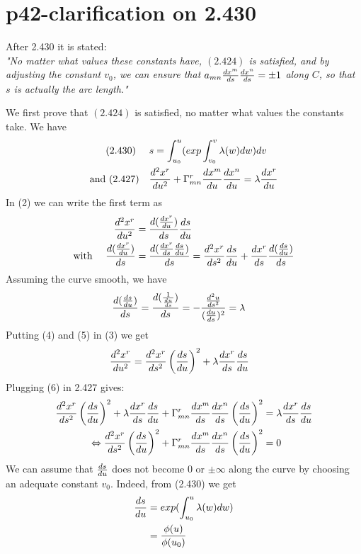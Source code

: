 \section{p42-clarification on 2.430}
\begin{tcolorbox}
After 2.430 it is stated:\\
\it{"No matter what values these constants have, $\mathbf{(2.424)}$ is satisfied, and by adjusting the constant $v_0$, we can ensure that $a_{mn}\dv{x^m}{s}\dv{x^n}{s} = \pm1$ along $C$, so that $s$ is actually the arc length."}
\end{tcolorbox}
We first prove that $\mathbf{(2.424)}$  is satisfied, no matter what values the constants take. We have
\begin{align}
\text{(2.430) } \quad  &s =\int_{u_0}^u(exp\int_{v_0}^v \lambda (w)dw)dv\\
\text{and (2.427)} \quad &\dv[2]{x^r}{u} + \Gamma^r_{mn}\dv{x^m}{u}\dv{x^n}{u} =  \lambda \dv{x^r}{u}
\end{align}
In (2) we can write the first term as
\begin{align}
\quad \dv[2]{x^r}{u} &= \dv{(\dv{x^r}{u})}{s}\dv{s}{u} \\
\text{with } \quad \dv{(\dv{x^r}{u})}{s} &=  \dv{(\dv{x^r}{s}\dv{s}{u})}{s} = \dv[2]{x^r}{s}\dv{s}{u}+\dv{x^r}{s}\dv{(\dv{s}{u})}{s} 
\end{align}
Assuming the curve smooth, we have
\begin{align}
\dv{(\dv{s}{u})}{s} & = \dv{(\frac{1}{\dv{u}{s}})}{s} = -\frac{\dv[2]{u}{s}}{(\dv{u}{s})^2}= \lambda
\end{align}
Putting (4) and (5) in (3) we get
\begin{align}
\dv[2]{x^r}{u} &= \dv[2]{x^r}{s} \left ( \dv{s}{u}\right )^2 + \lambda\dv{x^r}{s}\dv{s}{u}
\end{align}
Plugging (6) in 2.427 gives:
\begin{align}
\dv[2]{x^r}{s} \left (\dv{s}{u}\right )^2 + \lambda\dv{x^r}{s}\dv{s}{u} +\Gamma^r_{mn}\dv{x^m}{s}\dv{x^n}{s}\left (\dv{s}{u}\right )^2  &=  \lambda \dv{x^r}{s}\dv{s}{u}\\
\Leftrightarrow \dv[2]{x^r}{s} \left (\dv{s}{u}\right )^2 +\Gamma^r_{mn}\dv{x^m}{s}\dv{x^n}{s}\left (\dv{s}{u}\right )^2  &=  0
\end{align}
We can assume that $\dv{s}{u} $ does not become $0$ or $\pm \infty$ along the curve by choosing an adequate constant $v_0$. Indeed, from (2.430) we get
\begin{align}
\dv{s}{u}  &= exp(\int_{u_0}^u \lambda (w)dw)\\
\ &= \frac{\phi (u)}{\phi (u_0)}
\end{align}
